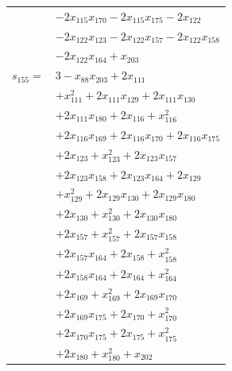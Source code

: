 \begin{longtable}{@{}r@{\;}l@{}}
 & \(\displaystyle -2x_{115}x_{170} -2x_{115}x_{175} -2x_{122}\) \\
 & \(\displaystyle -2x_{122}x_{123} -2x_{122}x_{157} -2x_{122}x_{158}\) \\
 & \(\displaystyle -2x_{122}x_{164} +x_{203}\) \\[3pt]
\(s_{155}=\) & \(\displaystyle 3 -x_{88}x_{203} +2x_{111}\) \\
 & \(\displaystyle +x_{111}^{2} +2x_{111}x_{129} +2x_{111}x_{130}\) \\
 & \(\displaystyle +2x_{111}x_{180} +2x_{116} +x_{116}^{2}\) \\
 & \(\displaystyle +2x_{116}x_{169} +2x_{116}x_{170} +2x_{116}x_{175}\) \\
 & \(\displaystyle +2x_{123} +x_{123}^{2} +2x_{123}x_{157}\) \\
 & \(\displaystyle +2x_{123}x_{158} +2x_{123}x_{164} +2x_{129}\) \\
 & \(\displaystyle +x_{129}^{2} +2x_{129}x_{130} +2x_{129}x_{180}\) \\
 & \(\displaystyle +2x_{130} +x_{130}^{2} +2x_{130}x_{180}\) \\
 & \(\displaystyle +2x_{157} +x_{157}^{2} +2x_{157}x_{158}\) \\
 & \(\displaystyle +2x_{157}x_{164} +2x_{158} +x_{158}^{2}\) \\
 & \(\displaystyle +2x_{158}x_{164} +2x_{164} +x_{164}^{2}\) \\
 & \(\displaystyle +2x_{169} +x_{169}^{2} +2x_{169}x_{170}\) \\
 & \(\displaystyle +2x_{169}x_{175} +2x_{170} +x_{170}^{2}\) \\
 & \(\displaystyle +2x_{170}x_{175} +2x_{175} +x_{175}^{2}\) \\
 & \(\displaystyle +2x_{180} +x_{180}^{2} +x_{202}\) \\[3pt]
\end{longtable}
\endgroup
